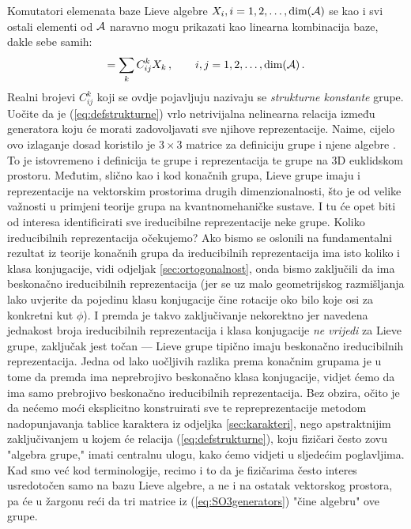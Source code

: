 Komutatori elemenata baze Lieve algebre $X_i, i=1,2,\ldots, \textrm{dim}(\mathcal{A})$ se
kao i svi ostali elementi od $\mathcal{A}$ naravno mogu prikazati kao linearna kombinacija baze, dakle
sebe samih: 
\begin{equation}
 [X_i, X_j]= \sum_k C_{ij}^{k} X_k \,,  \qquad i,j=1,2,\ldots, \textrm{dim}(\calA) \,.
 \label{eq:defstrukturne}
\end{equation}
Realni brojevi $C_{ij}^{k}$ koji se ovdje pojavljuju nazivaju se \emph{strukturne konstante} grupe.
Uočite da je (\ref{eq:defstrukturne}) vrlo netrivijalna nelinearna relacija između
generatora koju će morati zadovoljavati sve njihove reprezentacije.  Naime, cijelo ovo
izlaganje dosad koristilo je $3\times 3$ matrice za definiciju grupe  i njene
algebre . To je istovremeno i definicija te grupe i reprezentacija te grupe 
na 3D euklidskom prostoru.
Međutim, slično kao i kod konačnih grupa, Lieve grupe imaju i
reprezentacije na vektorskim prostorima drugih dimenzionalnosti, što je od velike
važnosti u primjeni teorije grupa na kvantnomehaničke sustave. I tu će opet biti od interesa
identificirati sve ireducibilne reprezentacije neke grupe. Koliko ireducibilnih
reprezentacija očekujemo? Ako bismo se oslonili na fundamentalni rezultat iz teorije
konačnih grupa da ireducibilnih reprezentacija ima isto koliko i klasa konjugacije,
vidi odjeljak \ref{sec:ortogonalnost}, onda bismo zaključili da  ima beskonačno
ireducibilnih reprezentacija (jer se uz malo geometrijskog razmišljanja lako uvjerite
da pojedinu klasu konjugacije čine rotacije oko bilo koje osi za konkretni kut $\phi$).
I premda je takvo zaključivanje nekorektno jer navedena jednakost broja ireducibilnih
reprezentacija i klasa konjugacije \emph{ne vrijedi} za Lieve grupe, zaključak jest
točan --- Lieve grupe tipično imaju beskonačno ireducibilnih reprezentacija.
Jedna od lako uočljivih razlika prema konačnim grupama je u tome da premda
 ima neprebrojivo beskonačno klasa konjugacije, vidjet ćemo da ima samo prebrojivo
beskonačno ireducibilnih reprezentacija.
Bez obzira, očito je da nećemo moći eksplicitno konstruirati sve te repreprezentacije
metodom nadopunjavanja tablice karaktera iz odjeljka \ref{sec:karakteri},
nego apstraktnijim zaključivanjem u kojem će
relacija (\ref{eq:defstrukturne}), koju fizičari često zovu "algebra grupe," imati
centralnu ulogu, kako ćemo vidjeti u sljedećim poglavljima.
Kad smo već kod terminologije, recimo i to da je fizičarima često interes usredotočen
samo na bazu Lieve algebre, a ne i na ostatak vektorskog prostora, pa će u žargonu
reći da tri matrice iz (\ref{eq:SO3generators}) "čine algebru" ove grupe.


